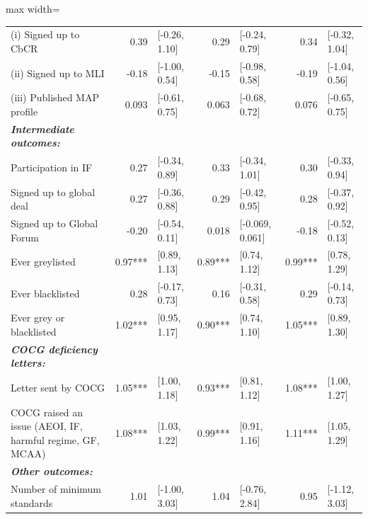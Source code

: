 \begin{adjustbox}{max width=\textwidth}
\begin{tabular}{l*{3}{r@{\hspace{3pt}}l}}
\hspace{.4cm} (i) Signed up to CbCR& 0.39 & [-0.26, 1.10] & 0.29 & [-0.24, 0.79] & 0.34 & [-0.32, 1.04] \\
\hspace{.4cm} (ii) Signed up to MLI& -0.18 & [-1.00, 0.54] & -0.15 & [-0.98, 0.58] & -0.19 & [-1.04, 0.56] \\
\hspace{.4cm} (iii) Published MAP profile& 0.093 & [-0.61, 0.75] & 0.063 & [-0.68, 0.72] & 0.076 & [-0.65, 0.75] \\
\midrule \emph{{\bf Intermediate outcomes: }}&&&&&&\\
\hspace{.4cm}  Participation in IF& 0.27 & [-0.34, 0.89] & 0.33 & [-0.34, 1.01] & 0.30 & [-0.33, 0.94] \\
\hspace{.4cm}  Signed up to global deal& 0.27 & [-0.36, 0.88] & 0.29 & [-0.42, 0.95] & 0.28 & [-0.37, 0.92] \\
\hspace{.4cm} Signed up to Global Forum& -0.20 & [-0.54, 0.11] & 0.018 & [-0.069, 0.061] & -0.18 & [-0.52, 0.13] \\
\hspace{.4cm} Ever greylisted& 0.97*** & [0.89, 1.13] & 0.89*** & [0.74, 1.12] & 0.99*** & [0.78, 1.29] \\
\hspace{.4cm} Ever blacklisted& 0.28 & [-0.17, 0.73] & 0.16 & [-0.31, 0.58] & 0.29 & [-0.14, 0.73] \\
\hspace{.4cm} Ever grey or blacklisted& 1.02*** & [0.95, 1.17] & 0.90*** & [0.74, 1.10] & 1.05*** & [0.89, 1.30] \\
\midrule \emph{{\bf COCG deficiency letters: }}&&&&&&\\
\hspace{.4cm} Letter sent by COCG& 1.05*** & [1.00, 1.18] & 0.93*** & [0.81, 1.12] & 1.08*** & [1.00, 1.27] \\
\hspace{.4cm} COCG raised an issue (AEOI, IF, harmful regime, GF, MCAA)& 1.08*** & [1.03, 1.22] & 0.99*** & [0.91, 1.16] & 1.11*** & [1.05, 1.29] \\
\midrule \emph{{\bf Other outcomes: }}&&&&&&\\
\hspace{.4cm} Number of minimum standards& 1.01 & [-1.00, 3.03] & 1.04 & [-0.76, 2.84] & 0.95 & [-1.12, 3.03] \\

\end{tabular}
\end{adjustbox}
